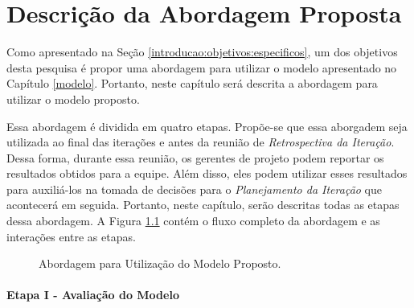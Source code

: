 \chapter{Descrição da Abordagem Proposta}
\label{descricao}

Como apresentado na Seção \ref{introducao:objetivos:especificos}, um dos objetivos desta pesquisa é propor uma abordagem para utilizar o modelo apresentado no Capítulo \ref{modelo}. Portanto, neste capítulo será descrita a abordagem para utilizar o modelo proposto.

Essa abordagem é dividida em quatro etapas. Propõe-se que essa aborgadem seja utilizada ao final das iterações e antes da reunião de \textit{Retrospectiva da Iteração}. Dessa forma, durante essa reunião, os gerentes de projeto podem reportar os resultados obtidos para a equipe. Além disso, eles podem utilizar esses resultados para auxiliá-los na tomada de decisões para o \textit{Planejamento da Iteração} que acontecerá em seguida. Portanto, neste capítulo, serão descritas todas as etapas dessa abordagem. A Figura \ref{descricao:etapas} contém o fluxo completo da abordagem e as interações entre as etapas.

\begin{figure}[ht!]
\begin{center}
	\end{center}
	\caption{Abordagem para Utilização do Modelo Proposto.}
	\label{descricao:etapas}
\end{figure}

\subsubsection{Etapa I - Avaliação do Modelo}
\label{descricao:avaliacao}

